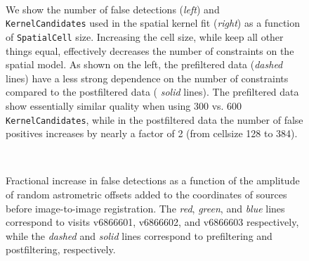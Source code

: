 \documentclass[prd, nofootinbib, floatfix, 11pt,tightenlines,times]{article}
\begin{document}
\begin{figure}
 \\
\caption{We show the number of false detections ({\it left}) and {\tt
    KernelCandidates} used in the spatial kernel fit ({\it right}) as
  a function of {\tt SpatialCell} size.  Increasing the cell size,
  while keep all other things equal, effectively decreases the number
  of constraints on the spatial model.  As shown on the left, the
  prefiltered data ({\it dashed} lines) have a less strong dependence
  on the number of constraints compared to the postfiltered data ({\it
    solid} lines).  The prefiltered data show essentially similar
  quality when using 300 vs. 600 {\tt KernelCandidates}, while in the
  postfiltered data the number of false positives increases by nearly
  a factor of 2 (from cellsize 128 to 384).  }
\label{cellsize}
\end{figure}

\begin{figure}
 \\
\caption{Fractional increase in false detections as a function of the
  amplitude of random astrometric offsets added to the coordinates of
  sources before image-to-image registration.  The {\it red}, {\it
    green}, and {\it blue} lines correspond to visits v6866601,
  v6866602, and v6866603 respectively, while the {\it dashed} and {\it
    solid} lines correspond to prefiltering and postfiltering,
  respectively.}
\label{wcsrms}
\end{figure}
\end{document}
